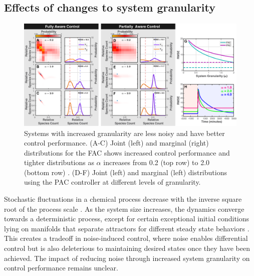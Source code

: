 \documentclass[12pt]{iopart}
\begin{document}
\subsection{Effects of changes to system granularity}
\begin{figure}[t!]
\begin{center}
\includegraphics[width=1\textwidth]{Granularity.pdf}
\vspace{-0.1in}
\caption{Systems with increased granularity are less noisy and have better control performance. (A-C) Joint (left) and marginal (right) distributions for the FAC shows increased control performance and tighter distributions as $\alpha$ increases from 0.2 (top row) to 2.0 (bottom row) . (D-F) Joint (left) and marginal (left) distributions using the PAC controller at different levels of granularity.}
\label{Volume}
\end{center}
\vspace{-0.2in}
\end{figure}
Stochastic fluctuations in a chemical process decrease with the inverse square root of the process scale \cite{Kampen1961}. As the system size increases, the dynamics converge towards a deterministic process, except for certain exceptional initial conditions lying on manifolds that separate attractors for different steady state behaviors \cite{XXX}. This creates a tradeoff in noise-induced control, where noise enables differential control but is also deleterious to maintaining desired states once they have been achieved. The impact of reducing noise through increased system granularity on control performance remains unclear.
\end{document}
